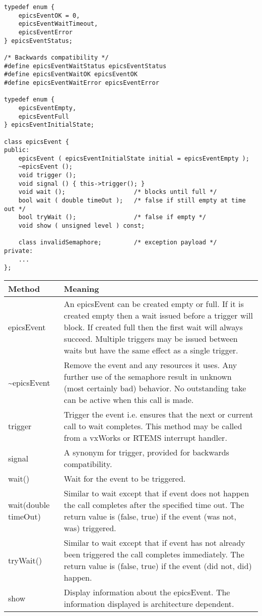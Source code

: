 \begin{verbatim}
typedef enum {
    epicsEventOK = 0,
    epicsEventWaitTimeout,
    epicsEventError
} epicsEventStatus;

/* Backwards compatibility */
#define epicsEventWaitStatus epicsEventStatus
#define epicsEventWaitOK epicsEventOK
#define epicsEventWaitError epicsEventError

typedef enum {
    epicsEventEmpty,
    epicsEventFull
} epicsEventInitialState;

class epicsEvent {
public:
    epicsEvent ( epicsEventInitialState initial = epicsEventEmpty );
    ~epicsEvent ();
    void trigger ();
    void signal () { this->trigger(); }
    void wait ();                   /* blocks until full */
    bool wait ( double timeOut );   /* false if still empty at time out */
    bool tryWait ();                /* false if empty */
    void show ( unsigned level ) const;

    class invalidSemaphore;         /* exception payload */
private:
    ...
};
\end{verbatim}

\begin{center}
\begin{longtable}{p{1.25in}p{5.0in}}
\textbf{Method} & \textbf{Meaning}\\
\hline
epicsEvent & An epicsEvent can be created empty or full.
If it is created empty then a wait issued before a trigger will block.
If created full then the first wait will always succeed.
Multiple triggers may be issued between waits but have the same effect as a single trigger.\\
\~{}epicsEvent & Remove the event and any resources it uses.
Any further use of the semaphore result in unknown (most certainly bad) behavior.
No outstanding take can be active when this call is made.\\
trigger & Trigger the event i.e. ensures that the next or current call to wait completes.
This method may be called from a vxWorks or RTEMS interrupt handler.\\
signal & A synonym for trigger, provided for backwards compatibility.\\
wait() & Wait for the event to be triggered.\\
wait(double timeOut) & Similar to wait except that if event does not happen the call completes after the specified time out.
The return value is (false, true) if the event (was not, was) triggered.\\
tryWait() & Similar to wait except that if event has not already been triggered the call completes immediately.
The return value is (false, true) if the event (did not, did) happen.\\
show & Display information about the epicsEvent.
The information displayed is architecture dependent.
\end{longtable}
\end{center}

